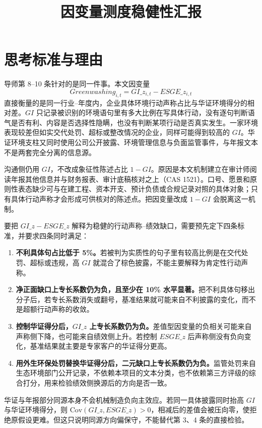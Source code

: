 \documentclass[12pt,a4paper]{article}
\title{因变量测度稳健性汇报}
\author{}
\date{}
\begin{document}
\maketitle

\section{思考标准与理由}

导师第 8--10 条针对的是同一件事。本文因变量
\begin{equation}
Greenwashing_{i,t}=GI\_z_{i,t}-ESGE\_z_{i,t}
\end{equation}
直接衡量的是同一行业--年度内，企业具体环境行动声称占比与华证环境得分的相对差。$GI$ 只记录被识别的环境语句里有多大比例在写具体行动，没有逐句判断语气是否有利、内容是否选择性隐瞒，也没有判断某项行动是否真实发生。一家环境表现较差但如实交代处罚、超标或整改情况的企业，同样可能得到较高的 $GI$。华证环境支柱又同时使用公司公开披露、环境管理信息与负面监管事件，与年报文本不是两套完全分离的信息源。

沟通侧仍用 $GI$，不改成象征性陈述占比 $1-GI$。原因是本文机制建立在审计师阅读年报其他信息并与财务报表、审计底稿核对之上（CAS 1521）。口号、愿景和原则性表态缺少可与在建工程、资本开支、预计负债或合规记录对照的具体对象；只有具体行动声称才会形成可供核对的陈述点。把因变量改成 $1-GI$ 会脱离这一机制。

要把 $GI\_z-ESGE\_z$ 解释为稳健的行动声称--绩效缺口，需要预先定下四条标准，并要求四条同时满足：

\begin{enumerate}
\item \textbf{不利具体句占比低于 5\%。}若被判为实质性的句子里有较高比例是在交代处罚、超标或违规，高 $GI$ 就混合了棕色披露，不能主要解释为肯定性行动声称。
\item \textbf{净正面缺口上专长系数仍为负，且至少在 10\% 水平显著。}把不利具体句移出分子后，若专长系数消失或翻号，基准结果就可能来自不利披露的变化，而不是超额行动声称的收敛。
\item \textbf{控制华证得分后，$GI\_z$ 上专长系数仍为负。}差值型因变量的负相关可能来自声称侧下降，也可能来自绩效侧上升。若控制 $ESGE\_z$ 后声称侧没有负向变化，基准结果就主要是专家客户的华证得分更高。
\item \textbf{用外生环保处罚替换华证得分后，二元缺口上专长系数仍为负。}监管处罚来自生态环境部门公开记录，不依赖本项目的文本分类，也不依赖第三方评级的综合打分，用来检验绩效侧换源后的方向是否一致。
\end{enumerate}

华证与年报部分同源本身不会机械制造负向主效应。若同一具体披露同时抬高 $GI$ 与华证环境得分，则 $\mathrm{Cov}(GI\_z,ESGE\_z)>0$，相减后的差值会被压向零，使拒绝原假设更难。但这只说明同源方向偏保守，不能替代第 3、4 条的直接检验。
\end{document}
